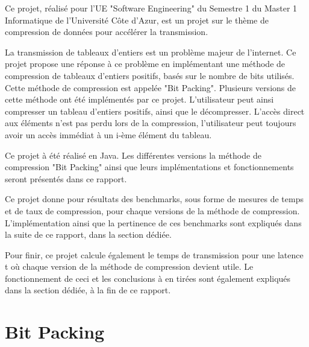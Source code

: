 \documentclass[titlepage]{article}
\begin{document}
Ce projet, réalisé pour l'UE "Software Engineering" du Semestre 1 du Master 1 Informatique de l'Université Côte d'Azur, est un projet sur le thème de compression de données pour accélérer la transmission.
\par La transmission de tableaux d'entiers est un problème majeur de l'internet. Ce projet propose une réponse à ce problème en implémentant une méthode de compression de tableaux d'entiers positifs, basés sur le nombre de bits utilisés. Cette méthode de compression est appelée "Bit Packing". Plusieurs versions de cette méthode ont été implémentés par ce projet. L'utilisateur peut ainsi compresser un tableau d'entiers positifs, ainsi que le décompresser. L'accès direct aux éléments n'est pas perdu lors de la compression, l'utilisateur peut toujours avoir un accès immédiat à un i-ème élément du tableau.
\par Ce projet à été réalisé en Java. Les différentes versions la méthode de compression "Bit Packing" ainsi que leurs implémentations et fonctionnements seront présentés dans ce rapport.
\par Ce projet donne pour résultats des benchmarks, sous forme de mesures de temps et de taux de compression, pour chaque versions de la méthode de compression. L'implémentation ainsi que la pertinence de ces benchmarks sont expliqués dans la suite de ce rapport, dans la section dédiée.
\par Pour finir, ce projet calcule également le temps de transmission pour une latence t où chaque version de la méthode de compression devient utile. Le fonctionnement de ceci et les conclusions à en tirées sont également expliqués dans la section dédiée, à la fin de ce rapport.

\clearpage




\section{Bit Packing}
\end{document}
